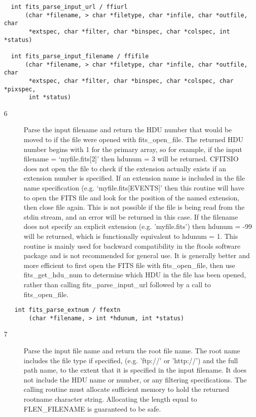 \documentclass[11pt]{book}
\begin{document}
\begin{verbatim}
  int fits_parse_input_url / ffiurl
      (char *filename, > char *filetype, char *infile, char *outfile, char
       *extspec, char *filter, char *binspec, char *colspec, int *status)

  int fits_parse_input_filename / ffifile
      (char *filename, > char *filetype, char *infile, char *outfile, char
       *extspec, char *filter, char *binspec, char *colspec, char *pixspec,
       int *status)
\end{verbatim}

\begin{description}
\item[6 ] Parse the input filename and return the HDU number that would be
moved to if the file were opened with fits\_open\_file.  The returned
HDU number begins with 1 for the primary array, so for example, if the
input filename = `myfile.fits[2]' then hdunum = 3 will be returned.
CFITSIO does not open the file to check if the extension actually
exists if an extension number is specified. If an extension name is
included in the file name specification (e.g.  `myfile.fits[EVENTS]'
then this routine will have to open the FITS file and look for the
position of the named extension, then close file again.  This is not
possible if the file is being read from the stdin stream, and an error
will be returned in this case.  If the filename does not specify an
explicit extension (e.g. 'myfile.fits') then hdunum = -99 will be
returned, which is functionally equivalent to hdunum = 1. This routine
is mainly used for backward compatibility in the ftools software
package and is not recommended for general use.  It is generally better
and more efficient to first open the FITS file with fits\_open\_file,
then use fits\_get\_hdu\_num to determine which HDU in the file has
been opened, rather than calling fits\_parse\_input\_url followed by a
call to fits\_open\_file.
 \label{ffextn}
\end{description}

\begin{verbatim}
   int fits_parse_extnum / ffextn
       (char *filename, > int *hdunum, int *status)
\end{verbatim}

\begin{description}
\item[7 ]Parse the input file name and return the root file name.  The root
name includes the file type if specified, (e.g.  'ftp://' or 'http://')
and the full path name, to the extent that it is specified in the input
filename.  It does not include the HDU name or number, or any filtering
specifications. The calling routine must allocate sufficient
memory to hold the returned rootname character string.  Allocating the length
equal to FLEN\_FILENAME is guaranteed to be safe.
 \label{ffrtnm}
\end{description}
\end{document}

